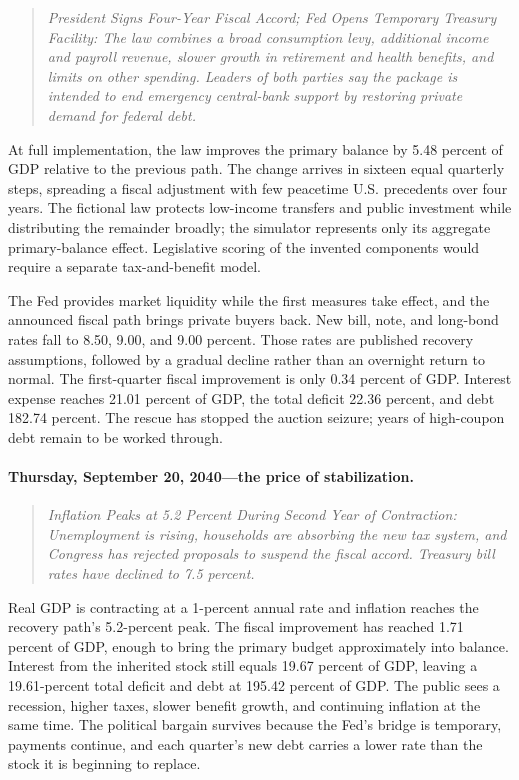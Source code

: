 \documentclass[11pt]{article}
\begin{document}
\begin{quote}
\small\itshape
President Signs Four-Year Fiscal Accord; Fed Opens Temporary Treasury Facility: The law
combines a broad consumption levy, additional income and payroll revenue, slower growth in
retirement and health benefits, and limits on other spending.  Leaders of both parties say
the package is intended to end emergency central-bank support by restoring private demand
for federal debt.
\end{quote}

At full implementation, the law improves the primary balance by 5.48 percent of GDP relative
to the previous path.  The change arrives in sixteen equal quarterly steps, spreading a
fiscal adjustment with few peacetime U.S. precedents over four years.  The fictional law protects
low-income transfers and public investment while distributing the remainder broadly; the
simulator represents only its aggregate primary-balance effect.  Legislative scoring of the
invented components would require a separate tax-and-benefit model.

The Fed provides market liquidity while the first measures take effect, and the announced
fiscal path brings private buyers back.  New bill, note, and long-bond rates fall to 8.50,
9.00, and 9.00 percent.  Those rates are published recovery assumptions, followed by a
gradual decline rather than an overnight return to normal.  The first-quarter fiscal
improvement is only 0.34 percent of GDP.  Interest expense reaches 21.01 percent of GDP, the
total deficit 22.36 percent, and debt 182.74 percent.  The rescue has stopped the auction
seizure; years of high-coupon debt remain to be worked through.

\paragraph{Thursday, September 20, 2040---the price of stabilization.}

\begin{quote}
\small\itshape
Inflation Peaks at 5.2 Percent During Second Year of Contraction: Unemployment is rising,
households are absorbing the new tax system, and Congress has rejected proposals to suspend
the fiscal accord.  Treasury bill rates have declined to 7.5 percent.
\end{quote}

Real GDP is contracting at a 1-percent annual rate and inflation reaches the recovery path's
5.2-percent peak.  The fiscal improvement has reached 1.71 percent of GDP, enough to bring
the primary budget approximately into balance.  Interest from the inherited stock still
equals 19.67 percent of GDP, leaving a 19.61-percent total deficit and debt at 195.42 percent
of GDP.  The public sees a recession, higher taxes, slower benefit growth, and continuing
inflation at the same time.  The political bargain survives because the Fed's bridge is
temporary, payments continue, and each quarter's new debt carries a lower rate than the
stock it is beginning to replace.
\end{document}
